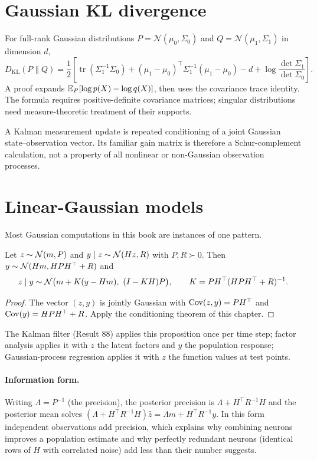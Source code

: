 \section{Gaussian KL divergence}
For full-rank Gaussian distributions
$P=\mathcal N(\mu_0,\Sigma_0)$ and
$Q=\mathcal N(\mu_1,\Sigma_1)$ in dimension $d$,
\[
D_{\mathrm{KL}}(P\|Q)=\frac12\left[
\operatorname{tr}(\Sigma_1^{-1}\Sigma_0)
+(\mu_1-\mu_0)^\top\Sigma_1^{-1}(\mu_1-\mu_0)
-d+\log\frac{\det\Sigma_1}{\det\Sigma_0}\right].
\]
A proof expands $\mathbb{E}_P[\log p(X)-\log q(X)]$, then
uses the covariance trace identity. The formula requires
positive-definite covariance matrices; singular distributions
need measure-theoretic treatment of their supports.

\begin{example}
A Kalman measurement update is repeated conditioning of a joint
Gaussian state--observation vector. Its familiar gain matrix is
therefore a Schur-complement calculation, not a property of
all nonlinear or non-Gaussian observation processes.
\end{example}
\section{Linear-Gaussian models}
Most Gaussian computations in this book are instances of one pattern.
\begin{proposition}
Let $z\sim\mathcal{N}(m,P)$ and $y\mid z\sim\mathcal{N}(Hz,R)$ with $P,R\succ0$.
Then $y\sim\mathcal{N}(Hm,HPH^\top+R)$ and
\[
z\mid y\sim\Normal\bigl(m+K(y-Hm),\ (I-KH)P\bigr),
\qquad K=PH^\top(HPH^\top+R)^{-1}.
\]
\end{proposition}
\begin{proof}
The vector $(z,y)$ is jointly Gaussian with $\operatorname{Cov}(z,y)=PH^\top$ and
$\operatorname{Cov}(y)=HPH^\top+R$. Apply the conditioning theorem of this chapter.
\end{proof}
The Kalman filter (Result 88) applies this proposition once per time
step; factor analysis applies it with $z$ the latent factors and $y$ the
population response; Gaussian-process regression applies it with $z$ the
function values at test points.

\paragraph{Information form.}
Writing $\Lambda=P^{-1}$ (the precision), the posterior precision is
$\Lambda+H^\top R^{-1}H$ and the posterior mean solves
$(\Lambda+H^\top R^{-1}H)\hat z=\Lambda m+H^\top R^{-1}y$. In this form
independent observations add precision, which explains why combining
neurons improves a population estimate and why perfectly redundant
neurons (identical rows of $H$ with correlated noise) add less than
their number suggests.

